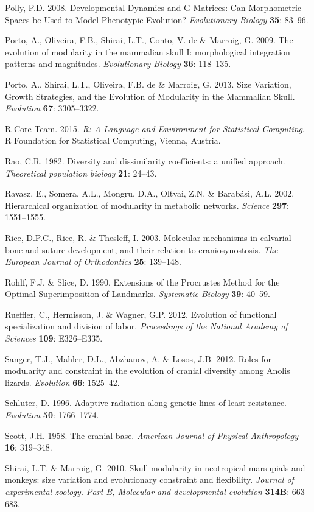 \documentclass[12pt,twoside]{report}
\begin{document}
Polly, P.D. 2008. Developmental Dynamics and G-Matrices: Can
Morphometric Spaces be Used to Model Phenotypic Evolution?
\emph{Evolutionary Biology} \textbf{35}: 83--96.

Porto, A., Oliveira, F.B., Shirai, L.T., Conto, V. de \& Marroig, G.
2009. The evolution of modularity in the mammalian skull I:
morphological integration patterns and magnitudes. \emph{Evolutionary
Biology} \textbf{36}: 118--135.

Porto, A., Shirai, L.T., Oliveira, F.B. de \& Marroig, G. 2013. Size
Variation, Growth Strategies, and the Evolution of Modularity in the
Mammalian Skull. \emph{Evolution} \textbf{67}: 3305--3322.

R Core Team. 2015. \emph{R: A Language and Environment for Statistical
Computing}. R Foundation for Statistical Computing, Vienna, Austria.

Rao, C.R. 1982. Diversity and dissimilarity coefficients: a unified
approach. \emph{Theoretical population biology} \textbf{21}: 24--43.

Ravasz, E., Somera, A.L., Mongru, D.A., Oltvai, Z.N. \& Barabási, A.L.
2002. Hierarchical organization of modularity in metabolic networks.
\emph{Science} \textbf{297}: 1551--1555.

Rice, D.P.C., Rice, R. \& Thesleff, I. 2003. Molecular mechanisms in
calvarial bone and suture development, and their relation to
craniosynostosis. \emph{The European Journal of Orthodontics}
\textbf{25}: 139--148.

Rohlf, F.J. \& Slice, D. 1990. Extensions of the Procrustes Method for
the Optimal Superimposition of Landmarks. \emph{Systematic Biology}
\textbf{39}: 40--59.

Rueffler, C., Hermisson, J. \& Wagner, G.P. 2012. Evolution of
functional specialization and division of labor. \emph{Proceedings of
the National Academy of Sciences} \textbf{109}: E326--E335.

Sanger, T.J., Mahler, D.L., Abzhanov, A. \& Losos, J.B. 2012. Roles for
modularity and constraint in the evolution of cranial diversity among
Anolis lizards. \emph{Evolution} \textbf{66}: 1525--42.

Schluter, D. 1996. Adaptive radiation along genetic lines of least
resistance. \emph{Evolution} \textbf{50}: 1766--1774.

Scott, J.H. 1958. The cranial base. \emph{American Journal of Physical
Anthropology} \textbf{16}: 319--348.

Shirai, L.T. \& Marroig, G. 2010. Skull modularity in neotropical
marsupials and monkeys: size variation and evolutionary constraint and
flexibility. \emph{Journal of experimental zoology. Part B, Molecular
and developmental evolution} \textbf{314B}: 663--683.
\end{document}
